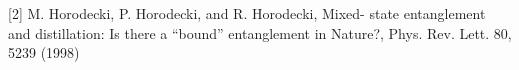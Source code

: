[2] M. Horodecki, P. Horodecki, and R. Horodecki, Mixed-
state entanglement and distillation: Is there a “bound”
entanglement in Nature?, Phys. Rev. Lett. 80, 5239
(1998)

